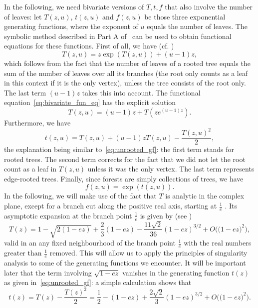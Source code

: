 \documentclass[a4paper]{article}
\theoremstyle{remark}
\begin{document}
In the following, we need bivariate versions of $T,t,f$ that also involve the number of leaves: let $T(z,u)$, $t(z,u)$ and $f(z,u)$ be those three exponential generating functions, where the exponent of $u$ equals the number of leaves. The symbolic method described in Part A of~\cite{Flajolet2009analytic} can be used to obtain functional equations for these functions. First of all, we have (cf. \cite[Theorem 3.13]{Drmota2009random})
\begin{equation}\label{eq:bivariate_fun_eq}
T(z,u) = z \exp(T(z,u)) + (u-1)z,
\end{equation}
which follows from the fact that the number of leaves of a rooted tree equals the sum of the number of leaves over all its branches (the root only counts as a leaf in this context if it is the only vertex), unless the tree consists of the root only. The last term $(u-1)z$ takes this into account. 
The functional equation~\eqref{eq:bivariate_fun_eq} has the explicit solution
\begin{equation}\label{eq:Tzu_explicit}
T(z,u) = (u-1)z + T(z e^{(u-1)z}).
\end{equation}
Furthermore, we have
\begin{equation}\label{eq:tzu_explicit}
t(z,u) = T(z,u) + (u-1)z T(z,u) - \frac{T(z,u)^2}{2},
\end{equation}
the explanation being similar to~\eqref{eq:unrooted_gf}: the first term stands for rooted trees. The second term corrects for the fact that we did not let the root count as a leaf in $T(z,u)$ unless it was the only vertex. The last term represents edge-rooted trees. Finally, since forests are simply collections of trees, we have
\begin{equation}\label{eq:fzu_explicit}
f(z,u) = \exp(t(z,u)).
\end{equation}
In the following, we will make use of the fact that $T$ is analytic in the complex plane, except for a branch cut along the positive real axis, starting at $\frac{1}{e}$ \cite{CGHJK,JosDer}. Its asymptotic expansion at the branch point $\frac1{e}$ is given by (see \cite[(4.22)]{CGHJK})
\begin{equation}\label{eq:tree_expansion}
T(z) = 1 - \sqrt{2(1-e z)} + \frac{2}{3}(1-ez) - \frac{11\sqrt{2}}{36} (1-ez)^{3/2} + O \Big( \Big(1- e z\Big)^2 \Big),
\end{equation}
valid in an any fixed neighbourhood of the branch point $\frac1{e}$ with the real numbers greater than $\frac1{e}$ removed. This will allow us to apply the principles of singularity analysis \cite[Chapter VI]{Flajolet2009analytic} to some of the generating functions we encounter. It will be important later that the term involving $\sqrt{1-e z}$ vanishes in the generating function $t(z)$ as given in~\eqref{eq:unrooted_gf}: a simple calculation shows that
\begin{equation}\label{eq:unrooted_expansion}
t(z) = T(z) - \frac{T(z)^2}{2} = \frac12 - (1- e z) + \frac{2\sqrt{2}}{3} (1-ez)^{3/2} + O \Big( \Big(1- e z\Big)^2 \Big).
\end{equation}
\end{document}
